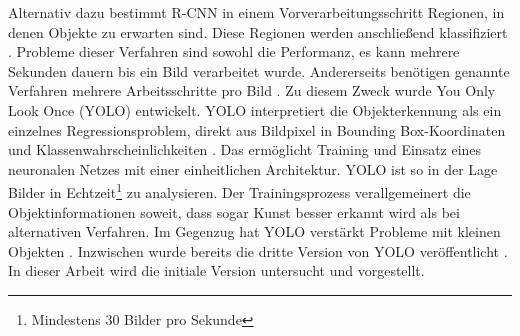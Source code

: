 Alternativ dazu bestimmt R-CNN in einem Vorverarbeitungsschritt Regionen, in denen Objekte zu erwarten sind. 
Diese Regionen werden anschlie\ss{end} klassifiziert \cite{Girshick2013}. \newline
Probleme dieser Verfahren sind sowohl die Performanz, es kann mehrere Sekunden dauern bis ein Bild verarbeitet wurde. 
Andererseits ben{\"o}tigen genannte Verfahren mehrere Arbeitsschritte pro Bild \cite{Redmon2015}. 
Zu diesem Zweck wurde You Only Look Once (YOLO) entwickelt. 
YOLO interpretiert die Objekterkennung \glqq als ein einzelnes Regressionsproblem, direkt aus Bildpixel in Bounding Box-Koordinaten und  Klassenwahrscheinlichkeiten\grqq{} \cite{Redmon2015}. 
Das erm{\"o}glicht Training und Einsatz eines neuronalen Netzes mit einer einheitlichen Architektur. 
YOLO ist so in der Lage Bilder in Echtzeit\footnote{Mindestens 30 Bilder pro Sekunde} zu analysieren.
Der Trainingsprozess verallgemeinert die Objektinformationen soweit, dass sogar Kunst besser erkannt wird als bei alternativen Verfahren.
Im Gegenzug hat YOLO verst{\"a}rkt Probleme mit kleinen Objekten \cite{Redmon2015}.
Inzwischen wurde bereits die dritte Version von YOLO ver{\"o}ffentlicht \cite{Redmon2018}. 
In dieser Arbeit wird die initiale Version untersucht und vorgestellt.